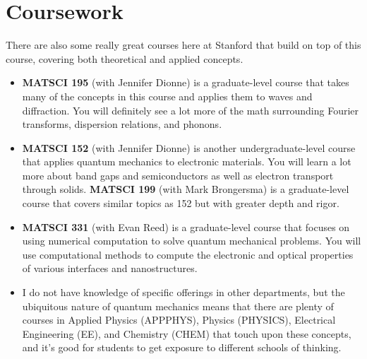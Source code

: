 
\section{Coursework}
There are also some really great courses here at Stanford that build on top of this course, covering both theoretical and applied concepts. \par 

\begin{itemize}
	\item \textbf{MATSCI 195} (with Jennifer Dionne) is a graduate-level course that takes many of the concepts in this course and applies them to waves and diffraction. You will definitely see a lot more of the math surrounding Fourier transforms, dispersion relations, and phonons.
	
	\item \textbf{MATSCI 152} (with Jennifer Dionne) is another undergraduate-level course that applies quantum mechanics to electronic materials. You will learn a lot more about band gaps and semiconductors as well as electron transport through solids. \textbf{MATSCI 199} (with Mark Brongersma) is a graduate-level course that covers similar topics as 152 but with greater depth and rigor.
	
	\item \textbf{MATSCI 331} (with Evan Reed) is a graduate-level course that focuses on using numerical computation to solve quantum mechanical problems. You will use computational methods to compute the electronic and optical properties of various interfaces and nanostructures.
	
	\item I do not have knowledge of specific offerings in other departments, but the ubiquitous nature of quantum mechanics means that there are plenty of courses in Applied Physics (APPPHYS), Physics (PHYSICS), Electrical Engineering (EE), and Chemistry (CHEM) that touch upon these concepts, and it's good for students to get exposure to different schools of thinking.	
\end{itemize}

